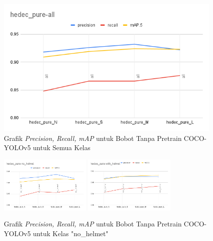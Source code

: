 \begin{figure}[ht]
  \centering
  \includegraphics[width=1\textwidth]{gambar/final_weight_val/hedec_pure-all.png}
  \caption{Grafik \emph{Precision, Recall, mAP} untuk Bobot Tanpa Pretrain COCO-YOLOv5 untuk Semua Kelas}
  \label{fig:grafval_pure_all}  
\end{figure}

\begin{figure}[ht]
  \centering
  \includegraphics[width=0.4\textwidth]{gambar/final_weight_val/hedec_pure-no_helmet.png}
  \includegraphics[width=0.4\textwidth]{gambar/final_weight_val/hedec_pure-with_helmet.png}
  \caption{Grafik \emph{Precision, Recall, mAP} untuk Bobot Tanpa Pretrain COCO-YOLOv5 untuk Kelas "no\_helmet"}
  \label{fig:grafval_pure_eachclass}  
\end{figure}



